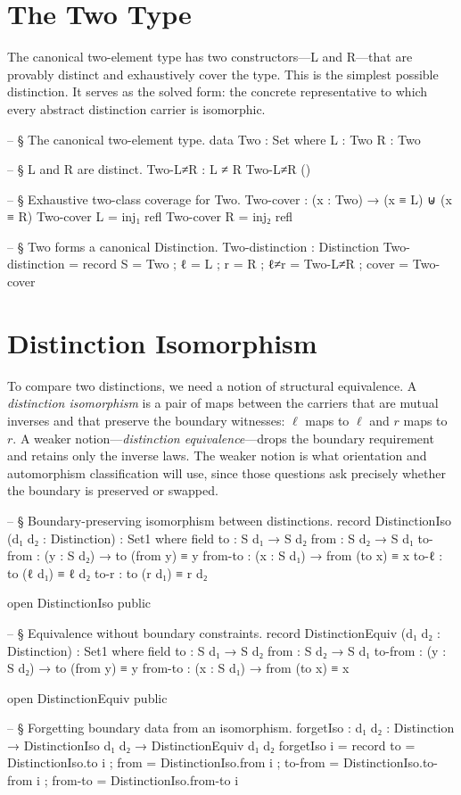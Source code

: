 \documentclass[11pt,a4paper]{book}
\def\texttt#1{#1}%
\begin{document}
\section{The Two Type}

The canonical two-element type has two constructors—\texttt{L} and \texttt{R}—that are provably distinct and exhaustively cover the type. This is the simplest possible distinction. It serves as the solved form: the concrete representative to which every abstract distinction carrier is isomorphic.

\begin{code}
-- § The canonical two-element type.
data Two : Set where
  L : Two
  R : Two

-- § L and R are distinct.
Two-L≠R : L ≠ R
Two-L≠R ()

-- § Exhaustive two-class coverage for Two.
Two-cover : (x : Two) → (x ≡ L) ⊎ (x ≡ R)
Two-cover L = inj₁ refl
Two-cover R = inj₂ refl

-- § Two forms a canonical Distinction.
Two-distinction : Distinction
Two-distinction = record
  { S     = Two
  ; ℓ     = L
  ; r     = R
  ; ℓ≠r   = Two-L≠R
  ; cover = Two-cover
  }
\end{code}

\section{Distinction Isomorphism}

To compare two distinctions, we need a notion of structural equivalence. A \textit{distinction isomorphism} is a pair of maps between the carriers that are mutual inverses and that preserve the boundary witnesses: $\ell$ maps to $\ell$ and $r$ maps to $r$. A weaker notion—\textit{distinction equivalence}—drops the boundary requirement and retains only the inverse laws. The weaker notion is what orientation and automorphism classification will use, since those questions ask precisely whether the boundary is preserved or swapped.

\begin{code}
-- § Boundary-preserving isomorphism between distinctions.
record DistinctionIso (d₁ d₂ : Distinction) : Set1 where
  field
    to      : S d₁ → S d₂
    from    : S d₂ → S d₁
    to-from : (y : S d₂) → to (from y) ≡ y
    from-to : (x : S d₁) → from (to x) ≡ x
    to-ℓ    : to (ℓ d₁) ≡ ℓ d₂
    to-r    : to (r d₁) ≡ r d₂

open DistinctionIso public

-- § Equivalence without boundary constraints.
record DistinctionEquiv (d₁ d₂ : Distinction) : Set1 where
  field
    to      : S d₁ → S d₂
    from    : S d₂ → S d₁
    to-from : (y : S d₂) → to (from y) ≡ y
    from-to : (x : S d₁) → from (to x) ≡ x

open DistinctionEquiv public

-- § Forgetting boundary data from an isomorphism.
forgetIso : {d₁ d₂ : Distinction} → DistinctionIso d₁ d₂ → DistinctionEquiv d₁ d₂
forgetIso i = record
  { to      = DistinctionIso.to i
  ; from    = DistinctionIso.from i
  ; to-from = DistinctionIso.to-from i
  ; from-to = DistinctionIso.from-to i
  }
\end{code}
\end{document}
